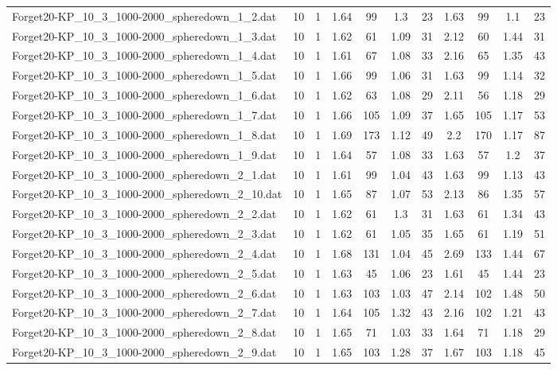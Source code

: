 \begin{table}[!ht]
\begin{tabular}{lcccccccccc}
Forget20-KP\_10\_3\_1000-2000\_spheredown\_1\_2.dat & 10 & 1 & 1.64 & 99 & 1.3 & 23 & 1.63 & 99 & 1.1 & 23 \\
Forget20-KP\_10\_3\_1000-2000\_spheredown\_1\_3.dat & 10 & 1 & 1.62 & 61 & 1.09 & 31 & 2.12 & 60 & 1.44 & 31 \\
Forget20-KP\_10\_3\_1000-2000\_spheredown\_1\_4.dat & 10 & 1 & 1.61 & 67 & 1.08 & 33 & 2.16 & 65 & 1.35 & 43 \\
Forget20-KP\_10\_3\_1000-2000\_spheredown\_1\_5.dat & 10 & 1 & 1.66 & 99 & 1.06 & 31 & 1.63 & 99 & 1.14 & 32 \\
Forget20-KP\_10\_3\_1000-2000\_spheredown\_1\_6.dat & 10 & 1 & 1.62 & 63 & 1.08 & 29 & 2.11 & 56 & 1.18 & 29 \\
Forget20-KP\_10\_3\_1000-2000\_spheredown\_1\_7.dat & 10 & 1 & 1.66 & 105 & 1.09 & 37 & 1.65 & 105 & 1.17 & 53 \\
Forget20-KP\_10\_3\_1000-2000\_spheredown\_1\_8.dat & 10 & 1 & 1.69 & 173 & 1.12 & 49 & 2.2 & 170 & 1.17 & 87 \\
Forget20-KP\_10\_3\_1000-2000\_spheredown\_1\_9.dat & 10 & 1 & 1.64 & 57 & 1.08 & 33 & 1.63 & 57 & 1.2 & 37 \\
Forget20-KP\_10\_3\_1000-2000\_spheredown\_2\_1.dat & 10 & 1 & 1.61 & 99 & 1.04 & 43 & 1.63 & 99 & 1.13 & 43 \\
Forget20-KP\_10\_3\_1000-2000\_spheredown\_2\_10.dat & 10 & 1 & 1.65 & 87 & 1.07 & 53 & 2.13 & 86 & 1.35 & 57 \\
Forget20-KP\_10\_3\_1000-2000\_spheredown\_2\_2.dat & 10 & 1 & 1.62 & 61 & 1.3 & 31 & 1.63 & 61 & 1.34 & 43 \\
Forget20-KP\_10\_3\_1000-2000\_spheredown\_2\_3.dat & 10 & 1 & 1.62 & 61 & 1.05 & 35 & 1.65 & 61 & 1.19 & 51 \\
Forget20-KP\_10\_3\_1000-2000\_spheredown\_2\_4.dat & 10 & 1 & 1.68 & 131 & 1.04 & 45 & 2.69 & 133 & 1.44 & 67 \\
Forget20-KP\_10\_3\_1000-2000\_spheredown\_2\_5.dat & 10 & 1 & 1.63 & 45 & 1.06 & 23 & 1.61 & 45 & 1.44 & 23 \\
Forget20-KP\_10\_3\_1000-2000\_spheredown\_2\_6.dat & 10 & 1 & 1.63 & 103 & 1.03 & 47 & 2.14 & 102 & 1.48 & 50 \\
Forget20-KP\_10\_3\_1000-2000\_spheredown\_2\_7.dat & 10 & 1 & 1.64 & 105 & 1.32 & 43 & 2.16 & 102 & 1.21 & 43 \\
Forget20-KP\_10\_3\_1000-2000\_spheredown\_2\_8.dat & 10 & 1 & 1.65 & 71 & 1.03 & 33 & 1.64 & 71 & 1.18 & 29 \\
Forget20-KP\_10\_3\_1000-2000\_spheredown\_2\_9.dat & 10 & 1 & 1.65 & 103 & 1.28 & 37 & 1.67 & 103 & 1.18 & 45 \\

\end{tabular}
\end{table}
